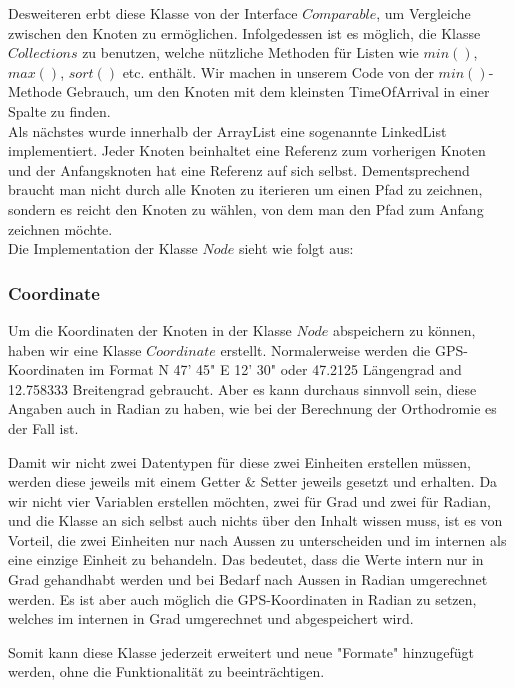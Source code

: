 Desweiteren erbt diese Klasse von der Interface $Comparable$, um Vergleiche zwischen den Knoten zu ermöglichen. Infolgedessen ist es möglich, die Klasse $Collections$ zu benutzen, welche nützliche Methoden für Listen wie $min()$, $max()$, $sort()$ etc. enthält. Wir machen in unserem Code von der $min()$-Methode Gebrauch, um den Knoten mit dem kleinsten TimeOfArrival in einer Spalte zu finden. \\

Als nächstes wurde innerhalb der ArrayList eine sogenannte LinkedList implementiert. Jeder Knoten beinhaltet eine Referenz zum vorherigen Knoten und der Anfangsknoten hat eine Referenz auf sich selbst. Dementsprechend braucht man nicht durch alle Knoten zu iterieren um einen Pfad zu zeichnen, sondern es reicht den Knoten zu wählen, von dem man den Pfad zum Anfang zeichnen möchte. \\

Die Implementation der Klasse $Node$ sieht wie folgt aus:



\subsubsection{Coordinate}
Um die Koordinaten der Knoten in der Klasse $Node$ abspeichern zu können, haben wir eine Klasse $Coordinate$ erstellt. Normalerweise werden die GPS-Koordinaten im Format N 47' 45" E 12' 30" oder 47.2125 Längengrad and 12.758333 Breitengrad gebraucht. Aber es kann durchaus sinnvoll sein, diese Angaben auch in Radian zu haben, wie bei der Berechnung der Orthodromie es der Fall ist. 

Damit wir nicht zwei Datentypen für diese zwei Einheiten erstellen müssen, werden diese jeweils mit einem Getter \& Setter jeweils gesetzt und erhalten. Da wir nicht vier Variablen erstellen möchten, zwei für Grad und zwei für Radian, und die Klasse an sich selbst auch nichts über den Inhalt wissen muss, ist es von Vorteil, die zwei Einheiten nur nach Aussen zu unterscheiden und im internen als eine einzige Einheit zu behandeln. Das bedeutet, dass die Werte intern nur in Grad gehandhabt werden und bei Bedarf nach Aussen in Radian umgerechnet werden. Es ist aber auch möglich die GPS-Koordinaten in Radian zu setzen, welches im internen in Grad umgerechnet und abgespeichert wird. 

Somit kann diese Klasse jederzeit erweitert und neue "Formate" hinzugefügt werden, ohne die Funktionalität zu beeinträchtigen. \\

